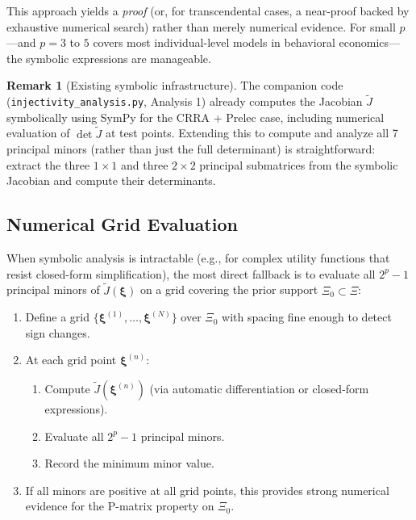 \documentclass[11pt,a4paper]{article}
\theoremstyle{definition}
\newtheorem{remark}[theorem]{Remark}
\newcommand{\bxi}{\boldsymbol{\xi}}
\begin{document}
This approach yields a \emph{proof} (or, for transcendental cases, a
near-proof backed by exhaustive numerical search) rather than merely
numerical evidence. For small $p$---and $p = 3$ to $5$ covers most
individual-level models in behavioral economics---the symbolic expressions
are manageable.

\begin{remark}[Existing symbolic infrastructure]
\label{rem:sympy}
The companion code (\texttt{injectivity\_analysis.py}, Analysis 1) already
computes the Jacobian $\widetilde{J}$ symbolically using SymPy for the
CRRA + Prelec case, including numerical evaluation of $\det \widetilde{J}$
at test points. Extending this to compute and analyze all 7 principal minors
(rather than just the full determinant) is straightforward: extract the three
$1 \times 1$ and three $2 \times 2$ principal submatrices from the symbolic
Jacobian and compute their determinants.
\end{remark}

\subsection{Numerical Grid Evaluation}

When symbolic analysis is intractable (e.g., for complex utility functions
that resist closed-form simplification), the most direct fallback is to
evaluate all $2^p - 1$ principal minors of $\widetilde{J}(\bxi)$ on a grid
covering the prior support $\Xi_0 \subset \Xi$:

\begin{enumerate}
    \item Define a grid $\{\bxi^{(1)}, \ldots, \bxi^{(N)}\}$ over $\Xi_0$
    with spacing fine enough to detect sign changes.

    \item At each grid point $\bxi^{(n)}$:
    \begin{enumerate}
        \item Compute $\widetilde{J}(\bxi^{(n)})$ (via automatic
        differentiation or closed-form expressions).
        \item Evaluate all $2^p - 1$ principal minors.
        \item Record the minimum minor value.
    \end{enumerate}

    \item If all minors are positive at all grid points, this provides strong
    numerical evidence for the P-matrix property on $\Xi_0$.
\end{enumerate}
\end{document}
